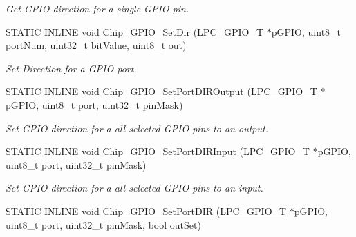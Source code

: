 \begin{DoxyCompactItemize}
\begin{DoxyCompactList}\small\item\em Get G\+P\+IO direction for a single G\+P\+IO pin. \end{DoxyCompactList}\item 
\hyperlink{group___l_p_c___types___public___macros_ga10b2d890d871e1489bb02b7e70d9bdfb}{S\+T\+A\+T\+IC} \hyperlink{spifi__18xx__43xx_8h_a2eb6f9e0395b47b8d5e3eeae4fe0c116}{I\+N\+L\+I\+NE} void \hyperlink{group___g_p_i_o__18_x_x__43_x_x_gacc2acb3d50b47954b25ef0ac439993d8}{Chip\+\_\+\+G\+P\+I\+O\+\_\+\+Set\+Dir} (\hyperlink{struct_l_p_c___g_p_i_o___t}{L\+P\+C\+\_\+\+G\+P\+I\+O\+\_\+T} $\ast$p\+G\+P\+IO, uint8\+\_\+t port\+Num, uint32\+\_\+t bit\+Value, uint8\+\_\+t out)
\begin{DoxyCompactList}\small\item\em Set Direction for a G\+P\+IO port. \end{DoxyCompactList}\item 
\hyperlink{group___l_p_c___types___public___macros_ga10b2d890d871e1489bb02b7e70d9bdfb}{S\+T\+A\+T\+IC} \hyperlink{spifi__18xx__43xx_8h_a2eb6f9e0395b47b8d5e3eeae4fe0c116}{I\+N\+L\+I\+NE} void \hyperlink{group___g_p_i_o__18_x_x__43_x_x_gaeeb23db039b2bf56ed96a9d6112fab69}{Chip\+\_\+\+G\+P\+I\+O\+\_\+\+Set\+Port\+D\+I\+R\+Output} (\hyperlink{struct_l_p_c___g_p_i_o___t}{L\+P\+C\+\_\+\+G\+P\+I\+O\+\_\+T} $\ast$p\+G\+P\+IO, uint8\+\_\+t port, uint32\+\_\+t pin\+Mask)
\begin{DoxyCompactList}\small\item\em Set G\+P\+IO direction for a all selected G\+P\+IO pins to an output. \end{DoxyCompactList}\item 
\hyperlink{group___l_p_c___types___public___macros_ga10b2d890d871e1489bb02b7e70d9bdfb}{S\+T\+A\+T\+IC} \hyperlink{spifi__18xx__43xx_8h_a2eb6f9e0395b47b8d5e3eeae4fe0c116}{I\+N\+L\+I\+NE} void \hyperlink{group___g_p_i_o__18_x_x__43_x_x_ga09e433572db2ec8a3e30e508ee5bcbd0}{Chip\+\_\+\+G\+P\+I\+O\+\_\+\+Set\+Port\+D\+I\+R\+Input} (\hyperlink{struct_l_p_c___g_p_i_o___t}{L\+P\+C\+\_\+\+G\+P\+I\+O\+\_\+T} $\ast$p\+G\+P\+IO, uint8\+\_\+t port, uint32\+\_\+t pin\+Mask)
\begin{DoxyCompactList}\small\item\em Set G\+P\+IO direction for a all selected G\+P\+IO pins to an input. \end{DoxyCompactList}\item 
\hyperlink{group___l_p_c___types___public___macros_ga10b2d890d871e1489bb02b7e70d9bdfb}{S\+T\+A\+T\+IC} \hyperlink{spifi__18xx__43xx_8h_a2eb6f9e0395b47b8d5e3eeae4fe0c116}{I\+N\+L\+I\+NE} void \hyperlink{group___g_p_i_o__18_x_x__43_x_x_ga6ceffe51a34be90a077b22657b1f90f0}{Chip\+\_\+\+G\+P\+I\+O\+\_\+\+Set\+Port\+D\+IR} (\hyperlink{struct_l_p_c___g_p_i_o___t}{L\+P\+C\+\_\+\+G\+P\+I\+O\+\_\+T} $\ast$p\+G\+P\+IO, uint8\+\_\+t port, uint32\+\_\+t pin\+Mask, bool out\+Set)

\end{DoxyCompactItemize}
